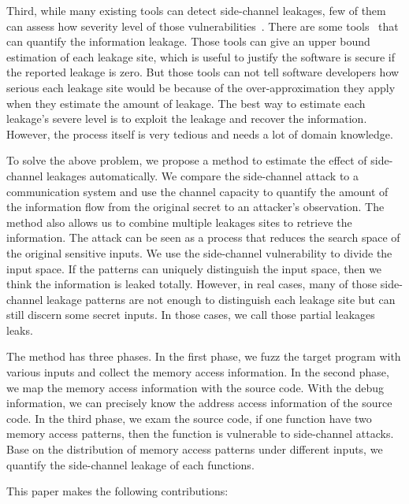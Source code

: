 Third, while many existing tools can detect side-channel leakages, few of them can assess how severity level of those vulnerabilities~\cite{203878,182946,Brotzman19Casym,236338,217537,Wichelmann:2018:MFF:3274694.3274741}. There are some tools~\cite{182946,Chattopadhyay:2017:QIL:3127041.3127044} that can quantify the information leakage. Those tools can give an upper bound estimation of each leakage site, which is useful to justify the software is secure if the reported leakage is zero. But those tools can not tell software developers how serious each leakage site would be because of the over-approximation they apply when they estimate the amount of leakage. The best way to estimate each leakage's severe level is to exploit the leakage and recover the information. However, the process itself is very tedious and needs a lot of domain knowledge.

To solve the above problem, we propose a method to estimate the effect of side-channel leakages automatically. We compare the side-channel attack to a communication system and use the channel capacity to quantify the amount of the information flow from the original secret to an attacker's observation. The method also allows us to combine multiple leakages sites to retrieve the information. The attack can be seen as a process that reduces the search space of the original sensitive inputs. We use the side-channel vulnerability to divide the input space. If the patterns can uniquely distinguish the input space, then we think the information is leaked totally. However, in real cases, many of those side-channel leakage patterns are not enough to distinguish each leakage site but can still discern some secret inputs. In those cases, we call those partial leakages leaks.

The method has three phases. In the first phase, we fuzz the target program with various inputs and collect the memory access information. In the second phase, we map the memory access information with the source code. With the debug information, we can precisely know the address access information of the source code. In the third phase, we exam the source code, if one function have two memory access patterns, then the function is vulnerable to side-channel attacks. Base on the distribution of memory access patterns under different inputs, we quantify the side-channel leakage of each functions.

This paper makes the following contributions:

